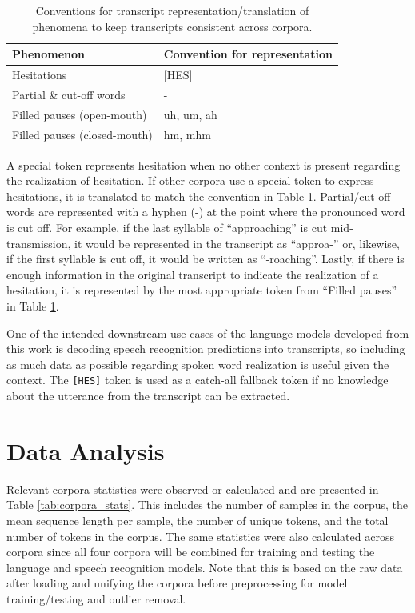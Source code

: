 \documentclass[12pt]{article}
\begin{document}
\begin{table}[!t]
    \centering
    \begin{tabular}{l l}
        \toprule
        Phenomenon                   & Convention for representation \\
        \midrule
        Hesitations                  & [HES]                         \\
        \midrule
        Partial \& cut-off words     & -                             \\
        \midrule
        Filled pauses (open-mouth)   & uh, um, ah                    \\
        \midrule
        Filled pauses (closed-mouth) & hm, mhm                       \\
        \bottomrule
    \end{tabular}
    \caption{Conventions for transcript representation/translation of phenomena to keep transcripts consistent across corpora.}
    \label{tab:phenomena_conventions}
\end{table}

A special token represents hesitation when no other context is present regarding the realization of hesitation. If other corpora use a special token to express hesitations, it is translated to match the convention in Table \ref{tab:phenomena_conventions}. Partial/cut-off words are represented with a hyphen (-) at the point where the pronounced word is cut off. For example, if the last syllable of ``approaching'' is cut mid-transmission, it would be represented in the transcript as ``approa-'' or, likewise, if the first syllable is cut off, it would be written as ``-roaching''. Lastly, if there is enough information in the original transcript to indicate the realization of a hesitation, it is represented by the most appropriate token from ``Filled pauses'' in Table \ref{tab:phenomena_conventions}.

One of the intended downstream use cases of the language models developed from this work is decoding speech recognition predictions into transcripts, so including as much data as possible regarding spoken word realization is useful given the context. The \lstinline|[HES]| token is used as a catch-all fallback token if no knowledge about the utterance from the transcript can be extracted.
\section{Data Analysis}\label{sec:data_analysis}
Relevant corpora statistics were observed or calculated and are presented in Table \ref{tab:corpora_stats}. This includes the number of samples in the corpus, the mean sequence length per sample, the number of unique tokens, and the total number of tokens in the corpus. The same statistics were also calculated across corpora since all four corpora will be combined for training and testing the language and speech recognition models. Note that this is based on the raw data after loading and unifying the corpora before preprocessing for model training/testing and outlier removal.
\end{document}
